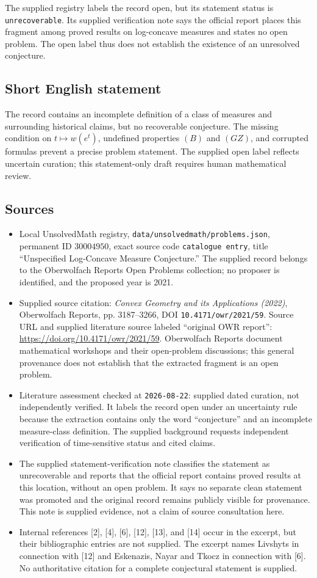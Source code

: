 \documentclass[11pt]{article}
\begin{document}
The supplied registry labels the record open, but its statement status is \texttt{unrecoverable}. Its supplied verification note says the official report places this fragment among proved results on log-concave measures and states no open problem. The open label thus does not establish the existence of an unresolved conjecture.
\subsection{Short English statement}
The record contains an incomplete definition of a class of measures and surrounding historical claims, but no recoverable conjecture. The missing condition on \(t\mapsto w(e^t)\), undefined properties \((B)\) and \((GZ)\), and corrupted formulas prevent a precise problem statement. The supplied open label reflects uncertain curation; this statement-only draft requires human mathematical review.
\subsection{Sources}
\begin{itemize}
\item Local UnsolvedMath registry, \texttt{data/unsolvedmath/problems.json}, permanent ID \(30004950\), exact source code \texttt{catalogue entry}, title ``Unspecified Log-Concave Measure Conjecture.'' The supplied record belongs to the Oberwolfach Reports Open Problems collection; no proposer is identified, and the proposed year is 2021.
\item Supplied source citation: \emph{Convex Geometry and its Applications (2022)}, Oberwolfach Reports, pp. 3187--3266, DOI \texttt{10.4171/owr/2021/59}. Source URL and supplied literature source labeled ``original OWR report'': \url{https://doi.org/10.4171/owr/2021/59}. Oberwolfach Reports document mathematical workshops and their open-problem discussions; this general provenance does not establish that the extracted fragment is an open problem.
\item Literature assessment checked at \texttt{2026-08-22}: supplied dated curation, not independently verified. It labels the record open under an uncertainty rule because the extraction contains only the word ``conjecture'' and an incomplete measure-class definition. The supplied background requests independent verification of time-sensitive status and cited claims.
\item The supplied statement-verification note classifies the statement as unrecoverable and reports that the official report contains proved results at this location, without an open problem. It says no separate clean statement was promoted and the original record remains publicly visible for provenance. This note is supplied evidence, not a claim of source consultation here.
\item Internal references [2], [4], [6], [12], [13], and [14] occur in the excerpt, but their bibliographic entries are not supplied. The excerpt names Livshyts in connection with [12] and Eskenazis, Nayar and Tkocz in connection with [6]. No authoritative citation for a complete conjectural statement is supplied.
\end{itemize}
\end{document}
